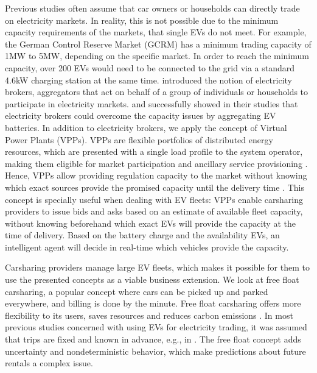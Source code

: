 \documentclass[12pt, article]{article}
\begin{document}
Previous studies often assume that car owners or households can directly trade
on electricity markets. In reality, this is not possible due to the minimum
capacity requirements of the markets, that single EVs do not meet. For example,
the German Control Reserve Market (GCRM) has a minimum trading capacity of 1MW
to 5MW, depending on the specific market. In order to reach the minimum
capacity, over 200 EVs would need to be connected to the grid via a standard
4.6kW charging station at the same time. \textcite{ketter13_power_tac} introduced
the notion of electricity brokers, aggregators that act on behalf of a group of
individuals or households to participate in electricity markets.
\textcite{brandt17_evaluat_busin_model_vehic_grid_integ} and
\textcite{kahlen14_balan_with_elect_vehic} successfully showed in their studies
that electricity brokers could overcome the capacity issues by aggregating EV
batteries. In addition to electricity brokers, we apply the concept of Virtual
Power Plants (VPPs). VPPs are flexible portfolios of distributed energy
resources, which are presented with a single load profile to the system
operator, making them eligible for market participation and ancillary service
provisioning \parencite{pudjianto07_virtual_power_plant_system_integ}. Hence, VPPs
allow providing regulation capacity to the market without knowing which exact
sources provide the promised capacity until the delivery time
\parencite{kahlen17_fleet}. This concept is specially useful when dealing with
EV fleets: VPPs enable carsharing providers to issue bids and asks based on an
estimate of available fleet capacity, without knowing beforehand which exact EVs
will provide the capacity at the time of delivery. Based on the battery charge
and the availability EVs, an intelligent agent will decide in real-time which
vehicles provide the capacity.

Carsharing providers manage large EV fleets, which makes it possible for them to
use the presented concepts as a viable business extension. We look at free float
carsharing, a popular concept where cars can be picked up and parked everywhere,
and billing is done by the minute. Free float carsharing offers more flexibility
to its users, saves resources and reduces carbon emissions
\parencite{firnkorn15_free_float_elect_carsh_fleet_smart_cities}. In most previous
studies concerned with using EVs for electricity trading, it was assumed that
trips are fixed and known in advance, e.g., in
\textcite{tomic07_using_fleet_elect_drive_vehic_grid_suppor}. The free float
concept adds uncertainty and nondeterministic behavior, which make predictions
about future rentals a complex issue.
\end{document}
